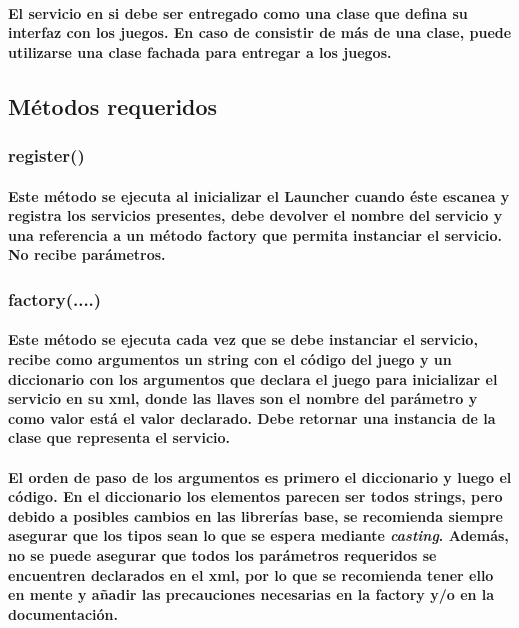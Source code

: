 \documentclass[language=spanish]{article}
\begin{document}
\paragraph{El servicio en si debe ser entregado como una clase que defina su interfaz con los juegos. En caso de consistir de más de una clase, puede utilizarse una clase fachada para entregar a los juegos.}

\subsection{Métodos requeridos}

\subsubsection{register()}

\paragraph{Este método se ejecuta al inicializar el Launcher cuando éste escanea y registra los servicios presentes, debe devolver el nombre del servicio y una referencia a un método factory que permita instanciar el servicio. No recibe parámetros.}

\subsubsection{factory(....)}

\paragraph{Este método se ejecuta cada vez que se debe instanciar el servicio, recibe como argumentos un string con el código del juego y un diccionario con los argumentos que declara el juego para inicializar el servicio en su xml, donde las llaves son el nombre del parámetro y como valor está el valor declarado. Debe retornar una instancia de la clase que representa el servicio.}
\paragraph{El orden de paso de los argumentos es primero el diccionario y luego el código. En el diccionario los elementos parecen ser todos strings, pero debido a posibles cambios en las librerías base, se recomienda siempre asegurar que los tipos sean lo que se espera mediante {\em casting}. Además, no se puede asegurar que todos los parámetros requeridos se encuentren declarados en el xml, por lo que se recomienda tener ello en mente y añadir las precauciones necesarias en la factory y/o en la documentación.}
\end{document}
